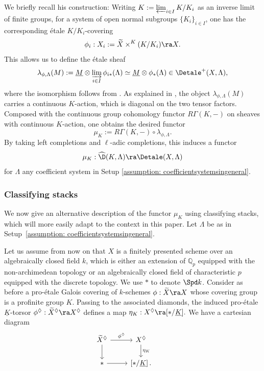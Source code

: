 \documentclass[letterpaper,11pt]{amsart}
\begin{document}
We briefly recall his construction: Writing $K := \varprojlim_{i \in I} K/K_{i}$ as an inverse limit of finite groups, for a system of open normal subgroups $\{K_i\}_{i\in I}$, one has the corresponding \'etale $K/K_{i}$-covering 
\[ \phi_{i}: X_{i}:=\widetilde{X}\times^K (K/K_i) \ra X.\]
This allows us to define the \'etale sheaf
\[ \lambda_{\phi,\Lambda}(M) := \underline{M} \otimes \varinjlim_{i \in I} \phi_{i*}(\Lambda) \simeq \underline{M} \otimes \phi_{*}(\Lambda) \in \Detale^+(X,\Lambda),  \]
where the isomorphism follows from \cite[Tag~09Z1]{stacks-project}. As explained in \cite[Section~1.8]{PinkHigherDirectImages}, the object $\lambda_{\phi,\Lambda}(M)$ carries a continuous $K$-action, which is diagonal on the two tensor factors. Composed with the continuous group cohomology functor $R\Gamma(K,-)$ on sheaves with continuous $K$-action, one obtains the desired functor
\[\mu_K:= R\Gamma(K,-)\circ \lambda_{\phi,\Lambda}.\]
By taking left completions and $\ell$-adic completions, this induces a functor
\[ \mu_{K}: \widehat{\D}(K,\Lambda) \ra \Detale(X,\Lambda) \]
for $\Lambda$ any coefficient system in Setup \ref{assumption: coefficientsystemsingeneral}.



\subsubsection{Classifying stacks}
We now give an alternative description of the functor $\mu_{K}$ using classifying stacks, which will more easily adapt to the context in this paper. Let $\Lambda$ be as in Setup~\ref{assumption: coefficientsystemsingeneral}. 

Let us assume from now on that $X$ is a finitely presented scheme over an algebraically closed field $k$, which is either an extension of $\mathbb{Q}_{p}$ equipped with the non-archimedean topology or an algebraically closed field of characteristic $p$ equipped with the discrete topology. We use $\ast$ to denote $\Spd k$. Consider as before a pro-\'etale Galois covering of $k$-schemes $\phi: \widetilde{X} \ra X$ whose covering group is a profinite group $K$. Passing to the associated diamonds, the induced pro-\'etale $\underline{K}$-torsor $\phi^{\Diamond}: \widetilde{X}^{\Diamond} \ra X^{\Diamond}$ defines a map $\eta_{K}: X^\Diamond \ra [\ast /\underline{K}].$ We have a cartesian diagram 
\begin{equation}{\label{eqn: CartesianDiagramofTorsors}}
\begin{tikzcd}
\widetilde{X}^{\Diamond} \arrow[d] \arrow[r, "\phi^{\Diamond}"] & X^{\Diamond} \arrow[d,"\eta_{K}"] & \\
\ast \arrow[r] & \left[\ast /\underline{K}\right]. & 
\end{tikzcd}
\end{equation}
\end{document}

